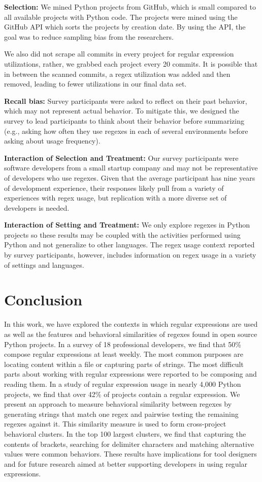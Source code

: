 \documentclass{sig-alternate-05-2015}
\begin{document}
\textbf{Selection:} We mined  Python projects from GitHub, which is  small compared to all available projects with Python code. The projects were mined using the GitHub API which sorts the projects by creation date. By using the API, the goal was to reduce  sampling bias from the researchers.

We also did not scrape all commits in every project for regular expression utilizations, rather, we grabbed each project every 20 commits. It is possible that in between the scanned commits, a regex utilization was added and then removed, leading to fewer utilizations in our final data set.

\textbf{Recall bias:} Survey participants were asked to reflect on their past behavior, which may not  represent actual behavior. To mitigate this, we designed the survey to lead participants to think about their behavior before summarizing (e.g., asking how often they use regexes in each of several environments before asking about usage frequency).

\textbf{Interaction of Selection and Treatment:} Our survey participants were software developers from a small startup company and may not be representative of developers who use regexes. Given that the average participant has nine years of development experience, their responses likely pull from a variety of experiences with regex usage, but replication with a more diverse set of developers is needed.

\textbf{Interaction of Setting and Treatment:}
We only explore regexes in Python projects so these results may be coupled with the activities performed using Python and not generalize to other languages. The regex usage context reported by survey participants, however, includes information on  regex usage in a  variety of settings and languages. 

\section{Conclusion}
\label{sec:conclusion}
In this work, we have explored the contexts in which regular expressions are used as well as the features and behavioral similarities of regexes found in open source Python projects. In a survey of 18 professional developers, we find that 50\% compose regular expressions at least weekly. The most common purposes are locating content within a file or capturing parts of strings. The most difficult parts about working with regular expressions were reported to be composing and reading them.
In a study of regular expression usage in nearly 4,000 Python projects, we find that over 42\% of projects contain a regular expression.
We present an approach to measure behavioral similarity between regexes by generating strings that match one regex and pairwise  testing the remaining regexes against it. This similarity measure is used to form cross-project behavioral clusters. In the top 100 largest clusters, we find that capturing the contents of brackets,  searching for delimiter characters and matching alternative values were common behaviors.
These results have implications for tool designers and for future research aimed at better supporting developers in using regular expressions.
\end{document}
